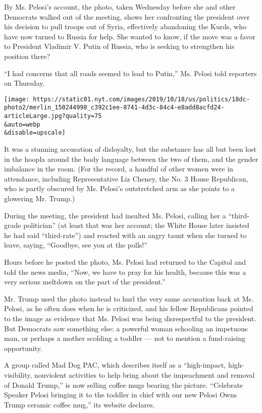 By Ms. Pelosi's account, the photo, taken Wednesday before she and other
Democrats walked out of the meeting, shows her confronting the president
over his decision to pull troops out of Syria, effectively abandoning
the Kurds, who have now turned to Russia for help. She wanted to know,
if the move was a favor to President Vladimir V. Putin of Russia, who is
seeking to strengthen his position there?

``I had concerns that all roads seemed to lead to Putin,'' Ms. Pelosi
told reporters on Thursday.

\texttt{[image: https://static01.nyt.com/images/2019/10/18/us/politics/18dc-photo2/merlin\_150244998\_c392c1ee-8741-4d3c-84c4-e8add8acfd24-articleLarge.jpg?quality=75\\\&auto=webp\\\&disable=upscale]}

It was a stunning accusation of disloyalty, but the substance has all
but been lost in the hoopla around the body language between the two of
them, and the gender imbalance in the room. (For the record, a handful
of other women were in attendance, including Representative Liz Cheney,
the No. 3 House Republican, who is partly obscured by Ms. Pelosi's
outstretched arm as she points to a glowering Mr. Trump.)

During the meeting, the president had insulted Ms. Pelosi, calling her a
``third-grade politician'' (at least that was her account; the White
House later insisted he had said ``third-rate'') and reacted with an
angry taunt when she turned to leave, saying, ``Goodbye, see you at the
polls!''

Hours before he posted the photo, Ms. Pelosi had returned to the Capitol
and told the news media, ``Now, we have to pray for his health, because
this was a very serious meltdown on the part of the president.''

Mr. Trump used the photo instead to hurl the very same accusation back
at Ms. Pelosi, as he often does when he is criticized, and his fellow
Republicans pointed to the image as evidence that Ms. Pelosi was being
disrespectful to the president. But Democrats saw something else: a
powerful woman schooling an impetuous man, or perhaps a mother scolding
a toddler --- not to mention a fund-raising opportunity.

A group called Mad Dog PAC, which describes itself as a ``high-impact,
high-visibility, nonviolent activities to help bring about the
impeachment and removal of Donald Trump,'' is now selling coffee mugs
bearing the picture. ``Celebrate Speaker Pelosi bringing it to the
toddler in chief with our new Pelosi Owns Trump ceramic coffee mug,''
its website declares.

